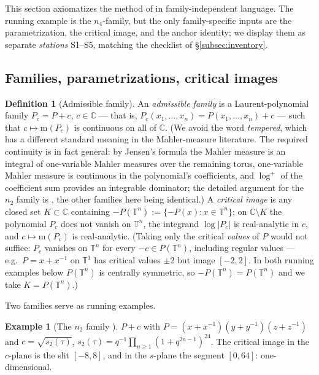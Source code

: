 \documentclass[11pt]{article}
\newcommand{\m}{\mathrm{m}}                 %
\newcommand{\Cc}{\mathbb{C}}
\newcommand{\Tt}{\mathbb{T}}
\theoremstyle{definition}
\newtheorem{definition}[theorem]{Definition}
\newtheorem{example}[theorem]{Example}
\theoremstyle{remark}
\begin{document}
This section axiomatizes the method of \cite[\S3--\S5]{Zf} in
family-independent language. The running example is the $n_4$-family,
but the only family-specific inputs are the parametrization, the
critical image, and the anchor identity; we display them as separate
\emph{stations} S1--S5, matching the checklist of
\S\ref{subsec:inventory}.

\subsection{Families, parametrizations, critical images}\label{subsec:fam}

\begin{definition}[Admissible family]\label{def:admissible}
An \emph{admissible family} is a Laurent-polynomial family $P_c=P+c$,
$c\in\Cc$ --- that is,
$P_c(x_1,\dots,x_n)=P(x_1,\dots,x_n)+c$ --- such that
$c\mapsto\m(P_c)$ is continuous on all of $\Cc$. (We avoid the word
\emph{tempered}, which has a different standard meaning in the
Mahler-measure literature. The required continuity is in fact
general: by Jensen's formula the Mahler measure is an integral of
one-variable Mahler measures over the remaining torus, one-variable
Mahler measure is continuous in the polynomial's coefficients, and
$\log^+$ of the coefficient sum provides an integrable dominator; the
detailed argument for the $n_2$ family is \cite[Lemma~2.1]{Zf}, the
other families here being identical.) A \emph{critical image} is any
closed set $K\subset\Cc$ containing
$-P(\Tt^n):=\{-P(x):x\in\Tt^n\}$; on $\Cc\setminus K$ the polynomial
$P_c$ does not vanish on $\Tt^n$, the integrand $\log|P_c|$ is
real-analytic in $c$, and $c\mapsto\m(P_c)$ is real-analytic.
(Taking only the critical \emph{values} of $P$ would not suffice:
$P_c$ vanishes on $\Tt^n$ for every $-c\in P(\Tt^n)$, including
regular values --- e.g.\ $P=x+x^{-1}$ on $\Tt^1$ has critical values
$\pm2$ but image $[-2,2]$. In both running examples below
$P(\Tt^n)$ is centrally symmetric, so $-P(\Tt^n)=P(\Tt^n)$ and we
take $K=\overline{P(\Tt^n)}$.)
\end{definition}

Two families serve as running examples.

\begin{example}[The $n_2$ family \cite{Zf}]\label{ex:n2}
$P+c$ with $P=(x+x^{-1})(y+y^{-1})(z+z^{-1})$ and
$c=\sqrt{s_2(\tau)}$, $s_2(\tau)=q^{-1}\prod_{n\ge1}(1+q^{2n-1})^{24}$.
The critical image in the $c$-plane is the slit $[-8,8]$, and in the
$s$-plane the segment $[0,64]$: one-dimensional.
\end{example}
\end{document}
